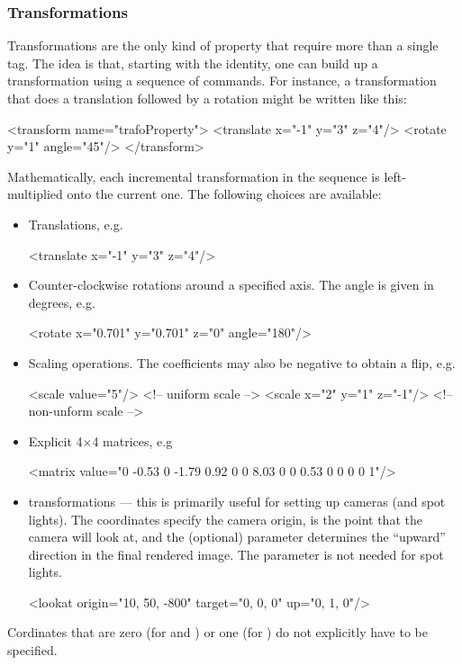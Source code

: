 \subsubsection{Transformations}
Transformations are the only kind of property that require more than a single tag. The idea is that, starting
with the identity, one can build up a transformation using a sequence of commands. For instance, a transformation that
does a translation followed by a rotation might be written like this:
\begin{xml}
<transform name="trafoProperty">
	<translate x="-1" y="3" z="4"/>
	<rotate y="1" angle="45"/>
</transform>
\end{xml}
Mathematically, each incremental transformation in the sequence is left-multiplied onto the current one. The following
choices are available:
\begin{itemize}
\item Translations, e.g.
\begin{xml}
<translate x="-1" y="3" z="4"/>
\end{xml}
\item Counter-clockwise rotations around a specified axis. The angle is given in degrees, e.g.
\begin{xml}
<rotate x="0.701" y="0.701" z="0" angle="180"/>
\end{xml}
\item Scaling operations. The coefficients may also be negative to obtain a flip, e.g.
\begin{xml}
<scale value="5"/>           <!-- uniform scale -->
<scale x="2" y="1" z="-1"/>  <!-- non-unform scale -->
\end{xml}
\item Explicit 4$\times$4 matrices, e.g
\begin{xml}
<matrix value="0 -0.53 0 -1.79 0.92 0 0 8.03 0 0 0.53 0 0 0 0 1"/>
\end{xml}
\item {} transformations --- this is primarily useful for setting up cameras (and spot lights). The  coordinates
specify the camera origin,  is the point that the camera will look at, and the
(optional)  parameter determines the ``upward'' direction in the final rendered image.
The  parameter is not needed for spot lights.
\begin{xml}
<lookat origin="10, 50, -800" target="0, 0, 0" up="0, 1, 0"/>
\end{xml}
\end{itemize}
Cordinates that are zero (for  and ) or one (for )
do not explicitly have to be specified.
